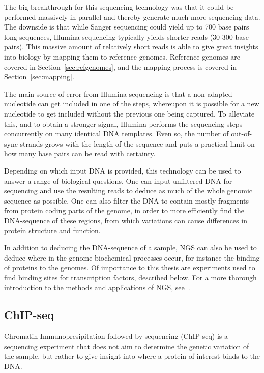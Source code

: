 The big breakthrough for this sequencing technology was that it could be performed massively in parallel and thereby generate much more sequencing data.
The downside is that while Sanger sequencing could yield up to 700 base pairs long sequences, Illumina sequencing typically yields shorter reads (30-300 base pairs).
This massive amount of relatively short reads is able to give great insights into biology by mapping them to reference genomes.
Reference genomes are covered in Section~\ref{sec:refgenomes}, and the mapping process is covered in Section~\ref{sec:mapping}.

The main source of error from Illumina sequencing is that a non-adapted nucleotide can get included in one of the steps, whereupon it is possible for a new nucleotide to get included without the previous one being captured.
To alleviate this, and to obtain a stronger signal, Illumina performs the sequencing steps concurrently on many identical DNA templates. Even so, the number of out-of-sync strands grows with the length of the sequence and puts a practical limit on how many base pairs can be read with certainty.

Depending on which input DNA is provided, this technology can be used to answer a range of biological questions.
One can input unfiltered DNA for sequencing and use the resulting reads to deduce as much of the whole genomic sequence as possible. One can also filter the DNA to contain mostly fragments from protein coding parts of the genome, in order to more efficiently find the DNA-sequence of these regions, from which variations can cause differences in protein structure and function.

In addition to deducing the DNA-sequence of a sample, NGS can also be used to deduce where in the genome biochemical processes occur, for instance the binding of proteins to the genomes. Of importance to this thesis are experiments used to find binding sites for transcription factors, described below. For a more thorough introduction to the methods and applications of NGS, see~\cite{ngs}.

\subsection{ChIP-seq}
Chromatin Immunopresipitation followed by sequencing (ChIP-seq) is a sequencing experiment that does not aim to determine the genetic variation of the sample, but rather to give insight into where a protein of interest binds to the DNA.

